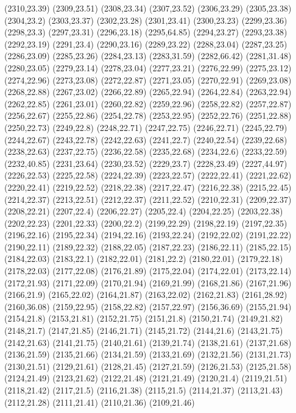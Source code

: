 (2310,23.39)
(2309,23.51)
(2308,23.34)
(2307,23.52)
(2306,23.29)
(2305,23.38)
(2304,23.2)
(2303,23.37)
(2302,23.28)
(2301,23.41)
(2300,23.23)
(2299,23.36)
(2298,23.3)
(2297,23.31)
(2296,23.18)
(2295,64.85)
(2294,23.27)
(2293,23.38)
(2292,23.19)
(2291,23.4)
(2290,23.16)
(2289,23.22)
(2288,23.04)
(2287,23.25)
(2286,23.09)
(2285,23.26)
(2284,23.13)
(2283,31.59)
(2282,66.42)
(2281,31.48)
(2280,23.05)
(2279,23.14)
(2278,23.04)
(2277,23.21)
(2276,22.99)
(2275,23.12)
(2274,22.96)
(2273,23.08)
(2272,22.87)
(2271,23.05)
(2270,22.91)
(2269,23.08)
(2268,22.88)
(2267,23.02)
(2266,22.89)
(2265,22.94)
(2264,22.84)
(2263,22.94)
(2262,22.85)
(2261,23.01)
(2260,22.82)
(2259,22.96)
(2258,22.82)
(2257,22.87)
(2256,22.67)
(2255,22.86)
(2254,22.78)
(2253,22.95)
(2252,22.76)
(2251,22.88)
(2250,22.73)
(2249,22.8)
(2248,22.71)
(2247,22.75)
(2246,22.71)
(2245,22.79)
(2244,22.67)
(2243,22.78)
(2242,22.63)
(2241,22.7)
(2240,22.54)
(2239,22.68)
(2238,22.63)
(2237,22.75)
(2236,22.58)
(2235,22.68)
(2234,22.6)
(2233,22.59)
(2232,40.85)
(2231,23.64)
(2230,23.52)
(2229,23.7)
(2228,23.49)
(2227,44.97)
(2226,22.53)
(2225,22.58)
(2224,22.39)
(2223,22.57)
(2222,22.41)
(2221,22.62)
(2220,22.41)
(2219,22.52)
(2218,22.38)
(2217,22.47)
(2216,22.38)
(2215,22.45)
(2214,22.37)
(2213,22.51)
(2212,22.37)
(2211,22.52)
(2210,22.31)
(2209,22.37)
(2208,22.21)
(2207,22.4)
(2206,22.27)
(2205,22.4)
(2204,22.25)
(2203,22.38)
(2202,22.23)
(2201,22.33)
(2200,22.2)
(2199,22.29)
(2198,22.19)
(2197,22.35)
(2196,22.16)
(2195,22.34)
(2194,22.16)
(2193,22.24)
(2192,22.02)
(2191,22.22)
(2190,22.11)
(2189,22.32)
(2188,22.05)
(2187,22.23)
(2186,22.11)
(2185,22.15)
(2184,22.03)
(2183,22.1)
(2182,22.01)
(2181,22.2)
(2180,22.01)
(2179,22.18)
(2178,22.03)
(2177,22.08)
(2176,21.89)
(2175,22.04)
(2174,22.01)
(2173,22.14)
(2172,21.93)
(2171,22.09)
(2170,21.94)
(2169,21.99)
(2168,21.86)
(2167,21.96)
(2166,21.9)
(2165,22.02)
(2164,21.87)
(2163,22.02)
(2162,21.83)
(2161,28.92)
(2160,36.08)
(2159,22.95)
(2158,22.82)
(2157,22.97)
(2156,36.69)
(2155,21.94)
(2154,21.8)
(2153,21.81)
(2152,21.75)
(2151,21.8)
(2150,21.74)
(2149,21.82)
(2148,21.7)
(2147,21.85)
(2146,21.71)
(2145,21.72)
(2144,21.6)
(2143,21.75)
(2142,21.63)
(2141,21.75)
(2140,21.61)
(2139,21.74)
(2138,21.61)
(2137,21.68)
(2136,21.59)
(2135,21.66)
(2134,21.59)
(2133,21.69)
(2132,21.56)
(2131,21.73)
(2130,21.51)
(2129,21.61)
(2128,21.45)
(2127,21.59)
(2126,21.53)
(2125,21.58)
(2124,21.49)
(2123,21.62)
(2122,21.48)
(2121,21.49)
(2120,21.4)
(2119,21.51)
(2118,21.42)
(2117,21.5)
(2116,21.38)
(2115,21.5)
(2114,21.37)
(2113,21.43)
(2112,21.28)
(2111,21.41)
(2110,21.36)
(2109,21.46)
